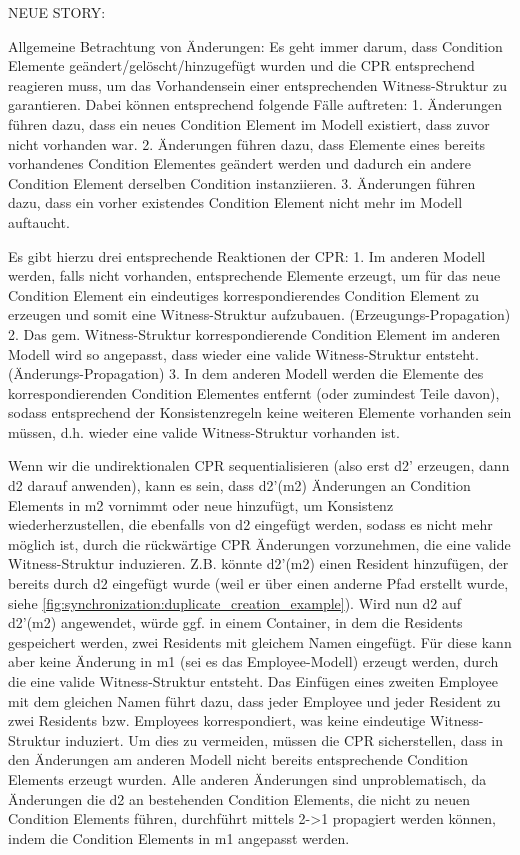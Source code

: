 NEUE STORY:

Allgemeine Betrachtung von Änderungen: Es geht immer darum, dass Condition Elemente geändert/gelöscht/hinzugefügt wurden und die CPR entsprechend reagieren muss, um das Vorhandensein einer entsprechenden Witness-Struktur zu garantieren. Dabei können entsprechend folgende Fälle auftreten:
1. Änderungen führen dazu, dass ein neues Condition Element im Modell existiert, dass zuvor nicht vorhanden war.
2. Änderungen führen dazu, dass Elemente eines bereits vorhandenes Condition Elementes geändert werden und dadurch ein andere Condition Element derselben Condition instanziieren.
3. Änderungen führen dazu, dass ein vorher existendes Condition Element nicht mehr im Modell auftaucht.

Es gibt hierzu drei entsprechende Reaktionen der CPR:
1. Im anderen Modell werden, falls nicht vorhanden, entsprechende Elemente erzeugt, um für das neue Condition Element ein eindeutiges korrespondierendes Condition Element zu erzeugen und somit eine Witness-Struktur aufzubauen. (Erzeugungs-Propagation)
2. Das gem. Witness-Struktur korrespondierende Condition Element im anderen Modell wird so angepasst, dass wieder eine valide Witness-Struktur entsteht. (Änderungs-Propagation)
3. In dem anderen Modell werden die Elemente des korrespondierenden Condition Elementes entfernt (oder zumindest Teile davon), sodass entsprechend der Konsistenzregeln keine weiteren Elemente vorhanden sein müssen, d.h. wieder eine valide Witness-Struktur vorhanden ist.

Wenn wir die undirektionalen CPR sequentialisieren (also erst d2' erzeugen, dann d2 darauf anwenden), kann es sein, dass d2'(m2) Änderungen an Condition Elements in m2 vornimmt oder neue hinzufügt, um Konsistenz wiederherzustellen, die ebenfalls von d2 eingefügt werden, sodass es nicht mehr möglich ist, durch die rückwärtige CPR Änderungen vorzunehmen, die eine valide Witness-Struktur induzieren.
Z.B. könnte d2'(m2) einen Resident hinzufügen, der bereits durch d2 eingefügt wurde (weil er über einen anderne Pfad erstellt wurde, siehe \autoref{fig:synchronization:duplicate_creation_example}). Wird nun d2 auf d2'(m2) angewendet, würde ggf. in einem Container, in dem die Residents gespeichert werden, zwei Residents mit gleichem Namen eingefügt. Für diese kann aber keine Änderung in m1 (sei es das Employee-Modell) erzeugt werden, durch die eine valide Witness-Struktur entsteht. Das Einfügen eines zweiten Employee mit dem gleichen Namen führt dazu, dass jeder Employee und jeder Resident zu zwei Residents bzw. Employees korrespondiert, was keine eindeutige Witness-Struktur induziert.
Um dies zu vermeiden, müssen die CPR sicherstellen, dass in den Änderungen am anderen Modell nicht bereits entsprechende Condition Elements erzeugt wurden.
Alle anderen Änderungen sind unproblematisch, da Änderungen die d2 an bestehenden Condition Elements, die nicht zu neuen Condition Elements führen, durchführt mittels 2->1 propagiert werden können, indem die Condition Elements in m1 angepasst werden.

